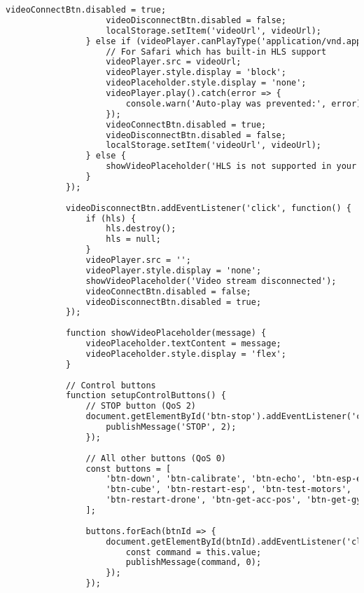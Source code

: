 \begin{lstlisting}[language=html]
                    videoConnectBtn.disabled = true;
                    videoDisconnectBtn.disabled = false;
                    localStorage.setItem('videoUrl', videoUrl);
                } else if (videoPlayer.canPlayType('application/vnd.apple.mpegurl')) {
                    // For Safari which has built-in HLS support
                    videoPlayer.src = videoUrl;
                    videoPlayer.style.display = 'block';
                    videoPlaceholder.style.display = 'none';
                    videoPlayer.play().catch(error => {
                        console.warn('Auto-play was prevented:', error);
                    });
                    videoConnectBtn.disabled = true;
                    videoDisconnectBtn.disabled = false;
                    localStorage.setItem('videoUrl', videoUrl);
                } else {
                    showVideoPlaceholder('HLS is not supported in your browser');
                }
            });
    
            videoDisconnectBtn.addEventListener('click', function() {
                if (hls) {
                    hls.destroy();
                    hls = null;
                }
                videoPlayer.src = '';
                videoPlayer.style.display = 'none';
                showVideoPlaceholder('Video stream disconnected');
                videoConnectBtn.disabled = false;
                videoDisconnectBtn.disabled = true;
            });
    
            function showVideoPlaceholder(message) {
                videoPlaceholder.textContent = message;
                videoPlaceholder.style.display = 'flex';
            }
    
            // Control buttons
            function setupControlButtons() {
                // STOP button (QoS 2)
                document.getElementById('btn-stop').addEventListener('click', function() {
                    publishMessage('STOP', 2);
                });
                
                // All other buttons (QoS 0)
                const buttons = [
                    'btn-down', 'btn-calibrate', 'btn-echo', 'btn-esp-echo', 
                    'btn-cube', 'btn-restart-esp', 'btn-test-motors', 
                    'btn-restart-drone', 'btn-get-acc-pos', 'btn-get-gyro'
                ];
                
                buttons.forEach(btnId => {
                    document.getElementById(btnId).addEventListener('click', function() {
                        const command = this.value;
                        publishMessage(command, 0);
                    });
                });
                

\end{lstlisting}
